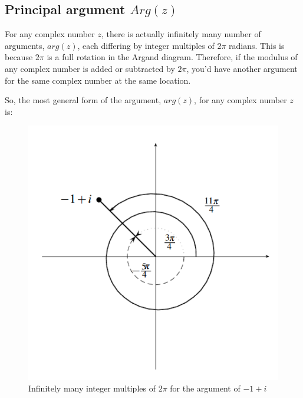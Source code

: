 \documentclass{article}
\begin{document}
\subsection{Principal argument $Arg(z)$}

For any complex number $z$, there is actually infinitely many number of arguments, $arg(z)$, each differing by integer multiples of $2\pi$ radians. This is because $2\pi$ is a full rotation in the Argand diagram. Therefore, if the modulus of any complex number is added or subtracted by $2\pi$, you'd have another argument for the same complex number at the same location.

\begin{center}
    So, the most general form of the argument, $arg(z)$, for any complex number $z$ is: 
\end{center}

\begin{figure}[H]
    \centering
    \includegraphics{../../../!assets/MATH1021-003-fig3.png}
    \caption{Infinitely many integer multiples of $2\pi$ for the argument of $-1+i$}
\end{figure}

\begin{center}
\end{center}
\end{document}
